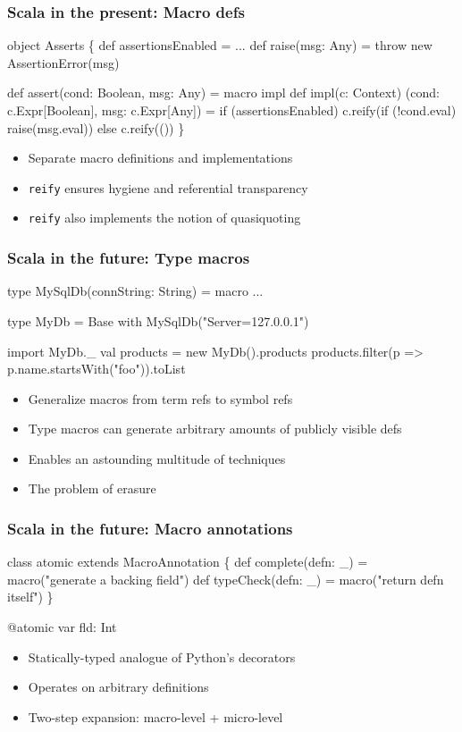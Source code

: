 \documentclass[hyperref={bookmarks=false}]{beamer}
\begin{document}
\begin{frame}[fragile]
\frametitle{Scala in the present: Macro defs}
\begin{semiverbatim}
object Asserts \{
  def assertionsEnabled = ...
  def raise(msg: Any) = throw new AssertionError(msg)

  def assert(cond: Boolean, msg: Any) = macro impl
  def impl(c: Context)
          (cond: c.Expr[Boolean], msg: c.Expr[Any]) =
    if (assertionsEnabled)
      c.reify(if (!cond.eval) raise(msg.eval))
    else
      c.reify(())
\}
\end{semiverbatim}

\begin{itemize}
\item Separate macro definitions and implementations
\item \texttt{reify} ensures hygiene and referential transparency
\item \texttt{reify} also implements the notion of quasiquoting
\end{itemize}
\end{frame}

\begin{frame}[fragile]
\frametitle{Scala in the future: Type macros}
\begin{semiverbatim}
type MySqlDb(connString: String) = macro ...

type MyDb = Base with MySqlDb("Server=127.0.0.1")

import MyDb._
val products = new MyDb().products
products.filter(p => p.name.startsWith("foo")).toList

\end{semiverbatim}

\begin{itemize}
\item Generalize macros from term refs to symbol refs
\item Type macros can generate arbitrary amounts of publicly visible defs
\item Enables an astounding multitude of techniques
\item The problem of erasure
\end{itemize}
\end{frame}

\begin{frame}[fragile]
\frametitle{Scala in the future: Macro annotations}
\begin{semiverbatim}
class atomic extends MacroAnnotation \{
  def complete(defn: _) = macro("generate a backing field")
  def typeCheck(defn: _) = macro("return defn itself")
\}

@atomic var fld: Int

\end{semiverbatim}

\begin{itemize}
\item Statically-typed analogue of Python's decorators
\item Operates on arbitrary definitions
\item Two-step expansion: macro-level + micro-level
\end{itemize}
\end{frame}
\end{document}
